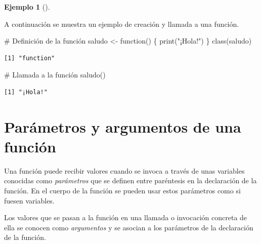 \documentclass[
  a4paper,
]{scrreport}
\newenvironment{Shaded}{\begin{snugshade}}{\end{snugshade}}
\newcommand{\CommentTok}[1]{\textcolor[rgb]{0.37,0.37,0.37}{#1}}
\newcommand{\ControlFlowTok}[1]{\textcolor[rgb]{0.00,0.23,0.31}{#1}}
\newcommand{\FunctionTok}[1]{\textcolor[rgb]{0.28,0.35,0.67}{#1}}
\newcommand{\NormalTok}[1]{\textcolor[rgb]{0.00,0.23,0.31}{#1}}
\newcommand{\OtherTok}[1]{\textcolor[rgb]{0.00,0.23,0.31}{#1}}
\newcommand{\StringTok}[1]{\textcolor[rgb]{0.13,0.47,0.30}{#1}}
\theoremstyle{definition}
\newtheorem{example}{Ejemplo}[chapter]
\theoremstyle{definition}
\theoremstyle{remark}
\begin{document}
\leavevmode{}%
\begin{example}[]\label{exm-creacion-funcion}

A continuación se muestra un ejemplo de creación y llamada a una
función.

\begin{Shaded}
\begin{Highlighting}[]
\CommentTok{\# Definición de la función}
\NormalTok{saludo }\OtherTok{\textless{}{-}} \ControlFlowTok{function}\NormalTok{() \{}
  \FunctionTok{print}\NormalTok{(}\StringTok{"¡Hola!"}\NormalTok{)}
\NormalTok{\}}
\FunctionTok{class}\NormalTok{(saludo)}
\end{Highlighting}
\end{Shaded}

\begin{verbatim}
[1] "function"
\end{verbatim}

\begin{Shaded}
\begin{Highlighting}[]
\CommentTok{\# Llamada a la función}
\FunctionTok{saludo}\NormalTok{()}
\end{Highlighting}
\end{Shaded}

\begin{verbatim}
[1] "¡Hola!"
\end{verbatim}

\end{example}

\hypertarget{paruxe1metros-y-argumentos-de-una-funciuxf3n}{%
\section{Parámetros y argumentos de una
función}\label{paruxe1metros-y-argumentos-de-una-funciuxf3n}}

Una función puede recibir valores cuando se invoca a través de unas
variables conocidas como \emph{parámetros} que se definen entre
paréntesis en la declaración de la función. En el cuerpo de la función
se pueden usar estos parámetros como si fuesen variables.

Los valores que se pasan a la función en una llamada o invocación
concreta de ella se conocen como \emph{argumentos} y se asocian a los
parámetros de la declaración de la función.
\end{document}
